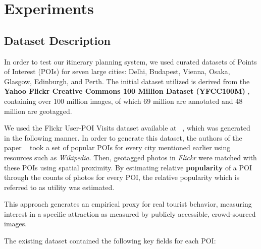 \section{Experiments}

\subsection{Dataset Description}
In order to test our itinerary planning system, we used curated datasets of Points of Interest (POIs) for seven large cities: Delhi, Budapest, Vienna, Osaka, Glasgow, Edinburgh, and Perth.  The initial dataset utilized is derived from the \textbf{Yahoo Flickr Creative Commons 100 Million Dataset (YFCC100M)} \cite{},  containing over 100 million images, of which 69 million are annotated and 48 million are geotagged.  

We used the Flickr User-POI Visits dataset available at ~\cite{limkwanhuiDataCode},  which was generated in the following manner. In order to generate this dataset, the authors of the paper ~\cite{taylor2018tour} took a set of popular POIs for every city mentioned earlier using resources such as \textit{Wikipedia}. Then, geotagged photos in \textit{Flickr} were matched with these POIs using spatial proximity. By estimating relative \textbf{popularity} of a POI through the counts of photos for every POI, the relative popularity which is referred to as utility was estimated.

This approach generates an empirical proxy for real tourist behavior, measuring interest in a specific attraction as measured by publicly accessible, crowd-sourced images.

The existing dataset contained the following key fields for each POI:

